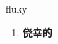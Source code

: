 
\begin{frame}
{\huge fluky}
\begin{center}
\begin{enumerate}\Large
  \item \textbf{侥幸的}
\end{enumerate}
\end{center}
\end{frame}
